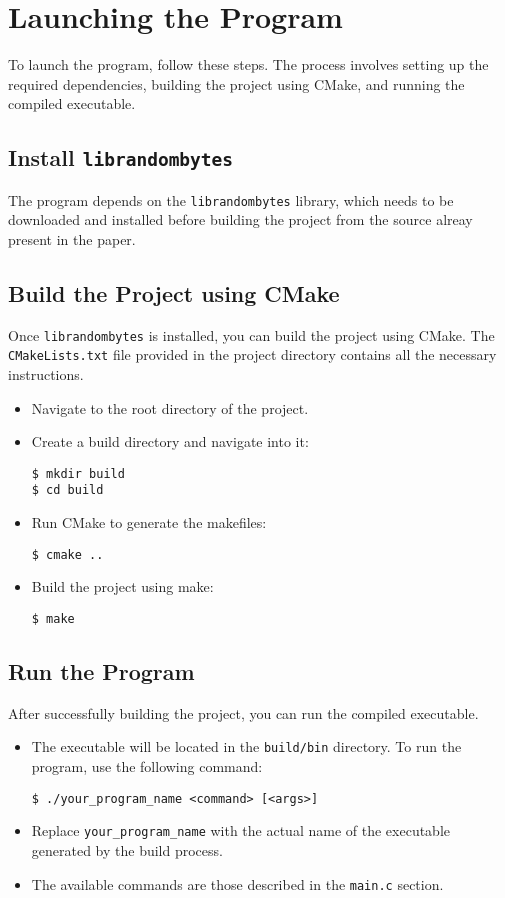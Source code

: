\section{Launching the Program}

To launch the program, follow these steps. The process involves setting up the required dependencies, building the project using CMake, and running the compiled executable.

\subsection{Install \texttt{librandombytes}}
The program depends on the \texttt{librandombytes} library, which needs to be downloaded and installed before building the project from the source alreay present in the paper.

\subsection{Build the Project using CMake}
Once \texttt{librandombytes} is installed, you can build the project using CMake. The \texttt{CMakeLists.txt} file provided in the project directory contains all the necessary instructions.

\begin{itemize}
    \item Navigate to the root directory of the project.
    \item Create a build directory and navigate into it:
\begin{verbatim}
$ mkdir build
$ cd build
\end{verbatim}
    \item Run CMake to generate the makefiles:
\begin{verbatim}
$ cmake ..
\end{verbatim}
    \item Build the project using make:
\begin{verbatim}
$ make
\end{verbatim}
\end{itemize}

\subsection{Run the Program}
After successfully building the project, you can run the compiled executable.

\begin{itemize}
    \item The executable will be located in the \texttt{build/bin} directory. To run the program, use the following command:
\begin{verbatim}
$ ./your_program_name <command> [<args>]
\end{verbatim}
    \item Replace \texttt{your\_program\_name} with the actual name of the executable generated by the build process.
    \item The available commands are those described in the \texttt{main.c} section.
\end{itemize}

